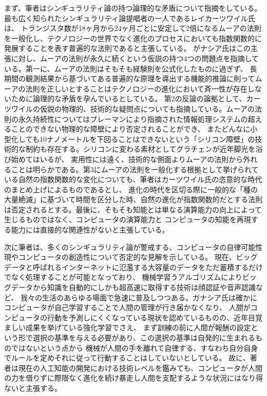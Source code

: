 \documentclass[uplatex]{jsarticle}
\begin{document}
まず、筆者はシンギュラリティ論の持つ論理的な矛盾について指摘をしている。最も広く知られたシンギュラリティ論提唱者の一人であるレイカーツワイル氏は、
トランジスタ数が18ヶ月から24ヶ月ごとに安定して2倍になるムーアの法則を一般化し、テクノロジーの世界でなく進化のプロセスにおいても指数関数的に発展することを表す普遍的な法則であると主張している。
がナシア氏はこの主張に対し、ムーアの法則が永久に続くという仮説の持つ4つの問題点を指摘している。第一に、ムーアの法則はそもそも経験則を公式化したものに過ぎず、
長期間の観測結果から基づいてある普遍的な原理を導出する機能的推論に則ってムーアの法則を正しいとすることはテクノロジーの進化において斉一性が存在しないために論理的な矛盾を孕んでいるとしている。
第2の反論の論拠として、カーツワイルの仮説の物理的、技術的な疑問点についても指摘している。ムーアの法則の永久持続性についてはブレーマンにより指摘された情報処理システムの超えることのできない物理的な障壁により否定されることができ、
またどんなに小型化しても10ナノメートルを下回ることはできないという「シリコン障壁」の技術的な制約も存在する。シリコンに変わる素材としてグラチェンが近年脚光を浴び始めてはいるが、
実用性には遠く、技術的な側面よりムーアの法則から外れることは明らかである。第3にムーアの法則を一般化する根拠として挙げられている自然の指数関数的な変化についても、筆者はカーツワイル氏の恣意的な時代のまとめ上げによるものであるとし、
進化の時代を区切る際に一般的な「種の大量絶滅」に基づいて時間を区分した時、自然の進化が指数関数的だとする法則は否定されるとする。最後に、そもそも知能とは単なる演算能力の向上によって生じるものではなく、コンピュータの演算能力と
コンピュータの知能を再現する能力には直接的な関連性がないと主張している。

次に筆者は、多くのシンギュラリティ論が警戒する、コンピュータの自律可能性現やコンピュータの創造性について否定的な見解を示している。
現在、ビッグデータと呼ばれるインターネットに氾濫する大容量のデータをただ蓄積するだけでなく処理することが可能となっており、
機械学習うアルゴリズムによりビッグデータから知識を自動的にしかも超高速に取得する技術は顔認証や音声認識など、
我々の生活のあらゆる場面で急速に普及しつつある。ガナシア氏は確かにコンピュータが自己学習することで人間の管理が行き届かなくなり、
人間がコンピュータの行動を予測しにくくなっている現状を認めているものの、近年目覚ましい成果を挙げている強化学習でさえ、
まず訓練の前に人間が報酬の設定という形で選択の基準を与える必要があり、この選択の基準は自発的に生まれるものではないという点から
機械が人間の手を離れて自律する、すなわち自分自身でルールを定めそれに従って行動することはしていないとしている。
故に、著者は現在の人工知能の開発における技術レベルを鑑みても、コンピュータが人間の力を借りずに際限なく進化を続け暴走し人間を支配するような状況にはなり得ないと主張する。
\end{document}
